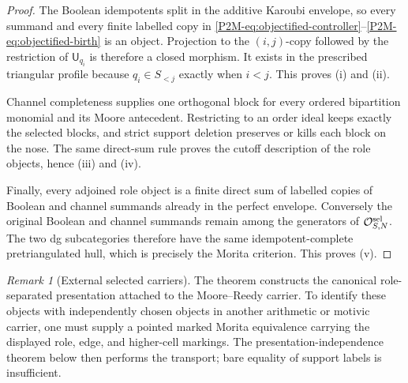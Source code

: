 \documentclass[11pt]{article}
\theoremstyle{remark}
\newtheorem{remark}[theorem]{Remark}
\begin{document}
\begin{proof}
The Boolean idempotents split in the additive Karoubi envelope, so every
summand and every finite labelled copy in
\eqref{P2M-eq:objectified-controller}--\eqref{P2M-eq:objectified-birth} is an
object.  Projection to the \((i,j)\)-copy followed by the restriction of
\(\mathsf U_{q_i}\) is therefore a closed morphism.  It exists in the prescribed
triangular profile because \(q_i\in S_{<j}\) exactly when \(i<j\).  This proves
\textup{(i)} and \textup{(ii)}.

Channel completeness supplies one orthogonal block for every ordered
bipartition monomial and its Moore antecedent.  Restricting to an order ideal
keeps exactly the selected blocks, and strict support deletion preserves or
kills each block on the nose.  The same direct-sum rule proves the cutoff
description of the role objects, hence \textup{(iii)} and \textup{(iv)}.

Finally, every adjoined role object is a finite direct sum of labelled copies
of Boolean and channel summands already in the perfect envelope.  Conversely the original
Boolean and channel summands remain among the generators of
\(\mathcal O_{S,N}^{\rm sel}\).  The two dg subcategories therefore have the
same idempotent-complete pretriangulated hull, which is precisely the Morita
criterion.  This proves \textup{(v)}.
\end{proof}

\begin{remark}[External selected carriers]
\label{P2M-rem:objectification-external-carrier-scope}
The theorem constructs the canonical role-separated presentation attached to
the Moore--Reedy carrier.  To identify these objects with independently chosen
objects in another arithmetic or motivic carrier, one must supply a pointed
marked Morita equivalence carrying the displayed role, edge, and higher-cell
markings.  The presentation-independence theorem below then performs the
transport; bare equality of support labels is insufficient.
\end{remark}
\end{document}
